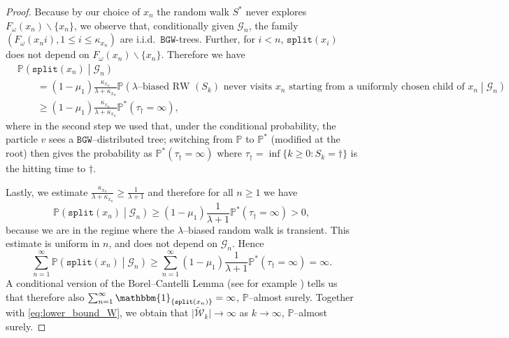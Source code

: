 \documentclass[11 pt]{article}
\theoremstyle{definition}
\numberwithin{equation}{section}
\newcommand{\ind}[1]{\mathbbm{1}_{\left\{ #1 \right\} } } %
\begin{document}
\begin{proof}
	  Because by our choice of $x_n$ the random walk $S^*$ never explores  $F_{\omega}(x_n)\backslash \{x_n\}$, we observe that, conditionally given $\mathcal{G}_n$, the family $(F_{\omega}(x_n i ), 1\le i\le \kappa_{x_n})$ are i.i.d.\  $\mathtt{BGW}$-trees. Further, for $i<n$, $\mathtt{split}(x_i)$ does not depend on $F_{\omega}(x_n)\backslash \{x_n\}$. Therefore we have
	\begin{align*}
		&\mathbb{P}\left(\mathtt{split}(x_n) \middle \vert \mathcal{G}_n\right)\\
		&\qquad = (1-\mu_1)\frac{\kappa_{x_n}}{\lambda+\kappa_{x_n}}\mathbb{P}\left(\text{$\lambda$--biased RW $(S_k)$ never visits $x_n$ starting from a uniformly chosen child of $x_n$}\middle\vert \mathcal{G}_n \right)\\
		&\qquad \geq (1-\mu_1)\frac{\kappa_{x_n}}{\lambda+\kappa_{x_n}}\mathbb{P}^*\left(\tau_{\dagger} = \infty \right),
	\end{align*}
	where in the second step we used that, under the conditional probability, the particle $v$ sees a $\mathtt{BGW}$--distributed tree; switching from $\mathbb{P}$ to $\mathbb{P}^*$  (modified at the root) then gives the probability as $\mathbb{P}^*(\tau_\dagger = \infty)$ where $\tau_\dagger = \inf\{k\ge 0\colon S_k =\dagger\}$ is the hitting time to $\dagger$. %
	
	Lastly, we estimate $\frac{\kappa_{x_n}}{\lambda + \kappa_{x_n}} \geq \frac{1}{\lambda + 1}$ and therefore for all $n\geq 1$ we have
	\begin{equation*}
		\mathbb{P}\left(\mathtt{split}(x_n) \middle \vert \mathcal{G}_n\right) \geq (1-\mu_1)\frac{1}{\lambda +1} \mathbb{P}^*\left(\tau_\dagger = \infty \right)>0,
	\end{equation*}
	because we are in the regime where the $\lambda$--biased random walk is transient. 
	This estimate is uniform in $n$, and does not depend on $\mathcal{G}_n$. Hence
	\begin{equation*}
		\sum_{n=1}^\infty \mathbb{P}\left(\mathtt{split}(x_n) \middle \vert \mathcal{G}_n\right) \geq \sum_{n=1}^\infty (1-\mu_1)\frac{1}{\lambda +1} \mathbb{P}^*\left(\tau_\dagger = \infty \right) = \infty.
	\end{equation*} 
	A conditional version of the Borel--Cantelli Lemma (see for example \cite[Cor. 9.21]{kallenberg_foundations_2021}) tells us that therefore also $\sum_{n=1}^\infty \ind{\mathtt{split}(x_n)} = \infty$, $\mathbb{P}$--almost surely. Together with \eqref{eq:lower_bound_W}, we obtain that $\vert \widetilde{\mathcal{W}}_k \vert \to \infty$ as $k \to \infty$, $\mathbb{P}$--almost surely. 
	\end{proof}
	
\end{document}

